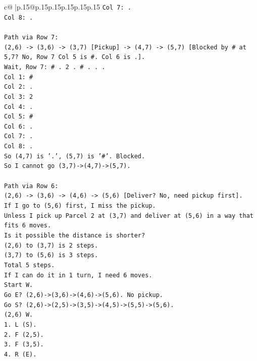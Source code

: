\documentclass{article}
\begin{document}
{\begin{supertabular}{c@{$\;$}|p{.15\linewidth}@{}p{.15\linewidth}p{.15\linewidth}p{.15\linewidth}p{.15\linewidth}p{.15\linewidth}}
{{{\texttt{Col 7: .} \\
\texttt{Col 8: .} \\
\\ 
\texttt{Path via Row 7:} \\
\texttt{(2,6) {-}> (3,6) {-}> (3,7) {[}Pickup{]} {-}> (4,7) {-}> (5,7) {[}Blocked by \# at 5,7? No, Row 7 Col 5 is \#. Col 6 is .{]}.} \\
\texttt{Wait, Row 7: \# . 2 . \# . . .} \\
\texttt{Col 1: \#} \\
\texttt{Col 2: .} \\
\texttt{Col 3: 2} \\
\texttt{Col 4: .} \\
\texttt{Col 5: \#} \\
\texttt{Col 6: .} \\
\texttt{Col 7: .} \\
\texttt{Col 8: .} \\
\texttt{So (4,7) is '.', (5,7) is '\#'. Blocked.} \\
\texttt{So I cannot go (3,7){-}>(4,7){-}>(5,7).} \\
\\ 
\texttt{Path via Row 6:} \\
\texttt{(2,6) {-}> (3,6) {-}> (4,6) {-}> (5,6) {[}Deliver? No, need pickup first{]}.} \\
\texttt{If I go to (5,6) first, I miss the pickup.} \\
\texttt{Unless I pick up Parcel 2 at (3,7) and deliver at (5,6) in a way that fits 6 moves.} \\
\texttt{Is it possible the distance is shorter?} \\
\texttt{(2,6) to (3,7) is 2 steps.} \\
\texttt{(3,7) to (5,6) is 3 steps.} \\
\texttt{Total 5 steps.} \\
\texttt{If I can do it in 1 turn, I need 6 moves.} \\
\texttt{Start W.} \\
\texttt{Go E? (2,6){-}>(3,6){-}>(4,6){-}>(5,6). No pickup.} \\
\texttt{Go S? (2,6){-}>(2,5){-}>(3,5){-}>(4,5){-}>(5,5){-}>(5,6).} \\
\texttt{(2,6) W.} \\
\texttt{1. L (S).} \\
\texttt{2. F (2,5).} \\
\texttt{3. F (3,5).} \\
\texttt{4. R (E).} \\
}}}
\end{supertabular}}
\end{document}
